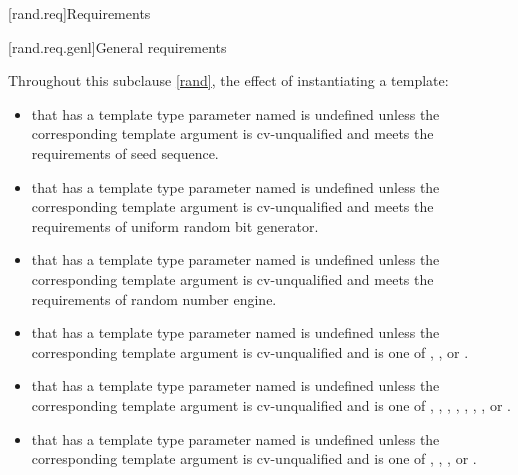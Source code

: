 
[rand.req]{Requirements}%


[rand.req.genl]{General requirements}%

\pnum
Throughout this subclause \ref{rand},
the effect of instantiating a template:
\begin{itemize}
  \item
    that has a template type parameter
    named 
    is undefined unless the corresponding template argument
    is cv-unqualified and
    meets the requirements
    of seed sequence.
  \item
    that has a template type parameter
    named 
    is undefined unless the corresponding template argument
    is cv-unqualified and
    meets the requirements
    of uniform random bit generator.
  \item
    that has a template type parameter
    named 
    is undefined unless the corresponding template argument
    is cv-unqualified and
    meets the requirements
    of random number engine.
  \item
    that has a template type parameter
    named 
    is undefined unless the corresponding template argument
    is cv-unqualified and
    is one of
    , , or .
  \item
    that has a template type parameter
    named 
    is undefined unless the corresponding template argument
    is cv-unqualified and
    is one of
      ,
      ,
      ,
      ,
      ,
      ,
      ,
      or
      .
  \item
    that has a template type parameter
    named 
    is undefined unless the corresponding template argument
    is cv-unqualified and
    is one of
      ,
      ,
      ,
      or
      .
\end{itemize}

